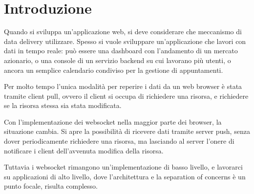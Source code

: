\documentclass[12pt,a4paper,openright,twoside]{report}
\newcommand\blankpage{%
    \null
    \thispagestyle{empty}%
    \addtocounter{page}{-1}%
    \newpage}
\begin{document}
\afterpage{\blankpage}

\linespread{1.3}

\normalsize
\clearpage{\pagestyle{empty}\cleardoublepage}
\tableofcontents

\listoffigures
{}


\chapter*{Introduzione}
Quando si sviluppa un’applicazione web, si deve considerare che meccanismo di data delivery utilizzare. Spesso si vuole sviluppare un’applicazione che lavori con dati in tempo reale: può essere una dashboard con l’andamento di un mercato azionario, o una console di un servizio backend su cui lavorano più utenti, o ancora un semplice calendario condiviso per la gestione di appuntamenti.

\bigskip

Per molto tempo l’unica modalità per reperire i dati da un web browser è stata tramite client pull, ovvero il client si occupa di richiedere una risorsa, e richiedere se la risorsa stessa sia stata modificata.

\bigskip

Con l’implementazione dei websocket nella maggior parte dei browser, la situazione cambia. Si apre la possibilità di ricevere dati tramite server push, senza dover periodicamente richiedere una risorsa, ma lasciando al server l’onere di notificare i client dell’avvenuta modifica della risorsa.

\bigskip

Tuttavia i websocket rimangono un’implementazione di basso livello, e lavorarci su applicazioni di alto livello, dove l’architettura e la separation of concerns è un punto focale, risulta complesso.
\end{document}
